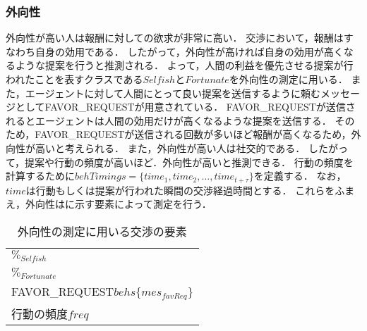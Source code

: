 \subsubsection*{外向性}
外向性が高い人は報酬に対しての欲求が非常に高い．
交渉において，報酬はすなわち自身の効用である．
したがって，外向性が高ければ自身の効用が高くなるような提案を行うと推測される．
よって，人間の利益を優先させる提案が行われたことを表すクラスである$\mathit{Selfish}$と$Fortunate$を外向性の測定に用いる．
また，エージェントに対して人間にとって良い提案を送信するように頼むメッセージとしてFAVOR\_REQUESTが用意されている．
FAVOR\_REQUESTが送信されるとエージェントは人間の効用だけが高くなるような提案を送信する．
そのため，FAVOR\_REQUESTが送信される回数が多いほど報酬が高くなるため，外向性が高いと考えられる．
また，外向性が高い人は社交的である．
したがって，提案や行動の頻度が高いほど．外向性が高いと推測できる．
行動の頻度を計算するために$behTimings = \{time_1, time_2 , \ldots , time_{t+\tau}\}$を定義する．
なお，$time$は行動もしくは提案が行われた瞬間の交渉経過時間とする．
これらをふまえ，外向性はに示す要素によって測定を行う．

\begin{table}[tb]
    \centering
    \caption{外向性の測定に用いる交渉の要素}
    \begin{tabular}{l} \toprule
        $\%_{\mathit{Selfish}}$ \\
        $\%_{Fortunate}$ \\
        FAVOR\_REQUEST$behs\{mes_{\mathit{favReq}}\}$ \\
        行動の頻度$\mathit{freq}$ \\ \bottomrule
    \end{tabular}
    \label{tab:extraversion}
\end{table}

